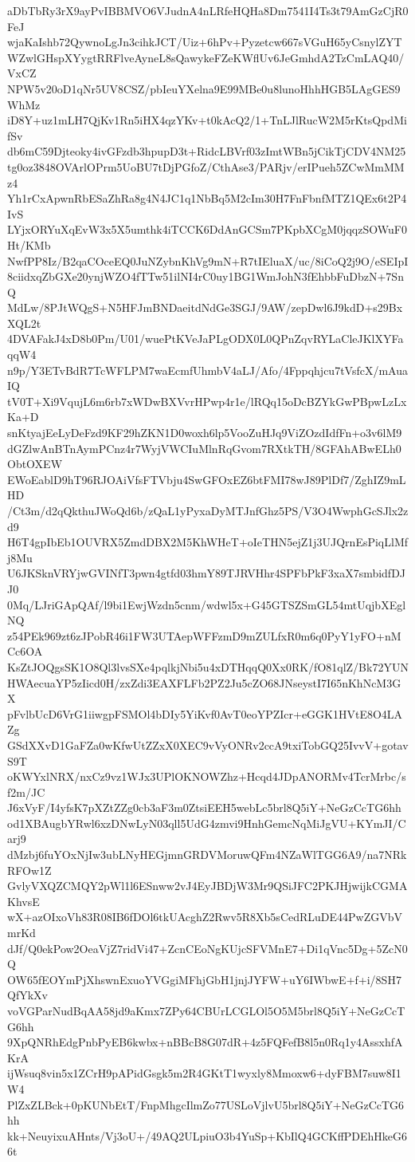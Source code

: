 aDbTbRy3rX9ayPvIBBMVO6VJudnA4nLRfeHQHa8Dm7541I4Ts3t79AmGzCjR0FeJ
wjaKaIshb72QywnoLgJn3cihkJCT/Uiz+6hPv+Pyzetcw667sVGuH65yCsnylZYT
WZwlGHspXYygtRRFlveAyneL8sQawykeFZeKWflUv6JeGmhdA2TzCmLAQ40/VxCZ
NPW5v20oD1qNr5UV8CSZ/pbIeuYXelna9E99MBe0u8lunoHhhHGB5LAgGES9WhMz
iD8Y+uz1mLH7QjKv1Rn5iHX4qzYKv+t0kAcQ2/1+TnLJlRucW2M5rKtsQpdMifSv
db6mC59Djteoky4ivGFzdb3hpupD3t+RidcLBVrf03zImtWBn5jCikTjCDV4NM25
tg0oz3848OVArlOPrm5UoBU7tDjPGfoZ/CthAse3/PARjv/erIPueh5ZCwMmMMz4
Yh1rCxApwnRbESaZhRa8g4N4JC1q1NbBq5M2cIm30H7FnFbnfMTZ1QEx6t2P4IvS
LYjxORYuXqEvW3x5X5umthk4iTCCK6DdAnGCSm7PKpbXCgM0jqqzSOWuF0Ht/KMb
NwfPP8Iz/B2qaCOceEQ0JuNZybnKhVg9mN+R7tIEluaX/uc/8iCoQ2j9O/eSEIpI
8ciidxqZbGXe20ynjWZO4fTTw51ilNI4rC0uy1BG1WmJohN3fEhbbFuDbzN+7SnQ
MdLw/8PJtWQgS+N5HFJmBNDaeitdNdGe3SGJ/9AW/zepDwl6J9kdD+s29BxXQL2t
4DVAFakJ4xD8b0Pm/U01/wuePtKVeJaPLgODX0L0QPnZqvRYLaCleJKlXYFaqqW4
n9p/Y3ETvBdR7TcWFLPM7waEcmfUhmbV4aLJ/Afo/4Fppqhjcu7tVsfcX/mAuaIQ
tV0T+Xi9VqujL6m6rb7xWDwBXVvrHPwp4r1e/lRQq15oDcBZYkGwPBpwLzLxKa+D
snKtyajEeLyDeFzd9KF29hZKN1D0woxh6lp5VooZuHJq9ViZOzdIdfFn+o3v6lM9
dGZlwAnBTnAymPCnz4r7WyjVWCIuMlnRqGvom7RXtkTH/8GFAhABwELh0ObtOXEW
EWoEablD9hT96RJOAiVfsFTVbju4SwGFOxEZ6btFMI78wJ89PlDf7/ZghIZ9mLHD
/Ct3m/d2qQkthuJWoQd6b/zQaL1yPyxaDyMTJnfGhz5PS/V3O4WwphGcSJlx2zd9
H6T4gpIbEb1OUVRX5ZmdDBX2M5KhWHeT+oIeTHN5ejZ1j3UJQrnEsPiqLlMfj8Mu
U6JKSknVRYjwGVINfT3pwn4gtfd03hmY89TJRVHhr4SPFbPkF3xaX7smbidfDJJ0
0Mq/LJriGApQAf/l9bi1EwjWzdn5cnm/wdwl5x+G45GTSZSmGL54mtUqjbXEglNQ
z54PEk969zt6zJPobR46i1FW3UTAepWFFzmD9mZULfxR0m6q0PyY1yFO+nMCc6OA
KsZtJOQgsSK1O8Ql3lvsSXe4pqlkjNbi5u4xDTHqqQ0Xx0RK/fO81qlZ/Bk72YUN
HWAecuaYP5zIicd0H/zxZdi3EAXFLFb2PZ2Ju5cZO68JNseystI7I65nKhNcM3GX
pFvlbUcD6VrG1iiwgpFSMOl4bDIy5YiKvf0AvT0eoYPZIcr+eGGK1HVtE8O4LAZg
GSdXXvD1GaFZa0wKfwUtZZxX0XEC9vVyONRv2ccA9txiTobGQ25IvvV+gotavS9T
oKWYxlNRX/nxCz9vz1WJx3UPlOKNOWZhz+Hcqd4JDpANORMv4TcrMrbc/sf2m/JC
J6xVyF/I4yfsK7pXZtZZg0cb3aF3m0ZtsiEEH5webLc5brl8Q5iY+NeGzCcTG6hh
od1XBAugbYRwl6xzDNwLyN03qll5UdG4zmvi9HnhGemcNqMiJgVU+KYmJI/Carj9
dMzbj6fuYOxNjIw3ubLNyHEGjmnGRDVMoruwQFm4NZaWlTGG6A9/na7NRkRFOw1Z
GvlyVXQZCMQY2pWl1l6ESnww2vJ4EyJBDjW3Mr9QSiJFC2PKJHjwijkCGMAKhvsE
wX+azOIxoVh83R08IB6fDOl6tkUAcghZ2Rwv5R8Xb5sCedRLuDE44PwZGVbVmrKd
dJf/Q0ekPow2OeaVjZ7ridVi47+ZcnCEoNgKUjcSFVMnE7+Di1qVnc5Dg+5ZcN0Q
OW65fEOYmPjXhswnExuoYVGgiMFhjGbH1jnjJYFW+uY6IWbwE+f+i/8SH7QfYkXv
voVGParNudBqAA58jd9aKmx7ZPy64CBUrLCGLOl5O5M5brl8Q5iY+NeGzCcTG6hh
9XpQNRhEdgPnbPyEB6kwbx+nBBcB8G07dR+4z5FQFefB8l5n0Rq1y4AssxhfAKrA
ijWsuq8vin5x1ZCrH9pAPidGsgk5m2R4GKtT1wyxly8Mmoxw6+dyFBM7suw8I1W4
PlZxZLBck+0pKUNbEtT/FnpMhgcIlmZo77USLoVjlvU5brl8Q5iY+NeGzCcTG6hh
kk+NeuyixuAHnts/Vj3oU+/49AQ2ULpiuO3b4YuSp+KbIlQ4GCKffPDEhHkeG66t
